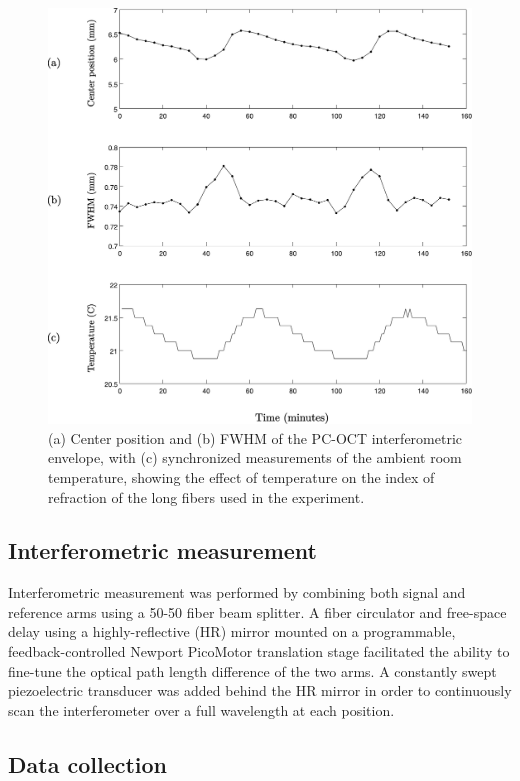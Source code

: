 \begin{figure}[h]
\begin{center}
\includegraphics[width=13cm]{figure-pcoct-dpplot.pdf}
\caption{(a) Center position and (b) FWHM of the PC-OCT interferometric envelope, with (c) synchronized measurements of the ambient room temperature, showing the effect of temperature on the index of refraction of the long fibers used in the experiment.}
\label{figure:pcoct-dpplot}
\end{center}
\end{figure}

\subsection{Interferometric measurement}

Interferometric measurement was performed by combining both signal and reference arms using a 50-50 fiber beam splitter. A fiber circulator and free-space delay using a highly-reflective (HR) mirror mounted on a programmable, feedback-controlled Newport PicoMotor translation stage facilitated the ability to fine-tune the optical path length difference of the two arms. A constantly swept piezoelectric transducer was added behind the HR mirror in order to continuously scan the interferometer over a full wavelength at each position.

\subsection{Data collection}

